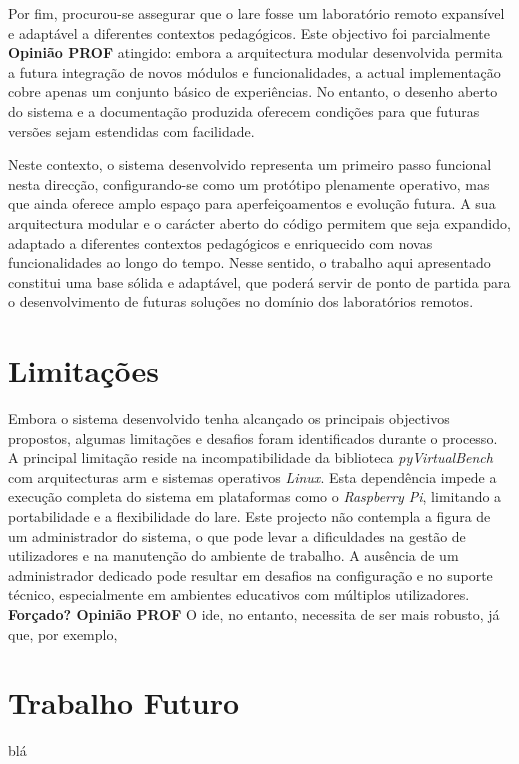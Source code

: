 Por fim, procurou-se assegurar que o \acrshort{lare} fosse um \acrshort{laboratório remoto} expansível e adaptável a diferentes contextos pedagógicos. Este objectivo foi parcialmente \textbf{Opinião PROF} atingido: embora a arquitectura modular desenvolvida permita a futura integração de novos módulos e funcionalidades, a actual implementação cobre apenas um conjunto básico de experiências. No entanto, o desenho aberto do sistema e a documentação produzida oferecem condições para que futuras versões sejam estendidas com facilidade.

Neste contexto, o sistema desenvolvido representa um primeiro passo funcional nesta direcção, configurando-se como um protótipo plenamente operativo, mas que ainda oferece amplo espaço para aperfeiçoamentos e evolução futura. A sua arquitectura modular e o carácter aberto do código permitem que seja expandido, adaptado a diferentes contextos pedagógicos e enriquecido com novas funcionalidades ao longo do tempo. Nesse sentido, o trabalho aqui apresentado constitui uma base sólida e adaptável, que poderá servir de ponto de partida para o desenvolvimento de futuras soluções no domínio dos laboratórios remotos.

\section{Limitações}
\label{limitacoes}
Embora o sistema desenvolvido tenha alcançado os principais objectivos propostos, algumas limitações e desafios foram identificados durante o processo. A principal limitação reside na incompatibilidade da biblioteca \textit{pyVirtualBench} com arquitecturas \acrshort{arm} e sistemas operativos \textit{Linux}. Esta dependência impede a execução completa do sistema em plataformas como o \textit{Raspberry Pi}, limitando a portabilidade e a flexibilidade do \acrshort{lare}. Este projecto não contempla a figura de um administrador do sistema, o que pode levar a dificuldades na gestão de utilizadores e na manutenção do ambiente de trabalho. A ausência de um administrador dedicado pode resultar em desafios na configuração e no suporte técnico, especialmente em ambientes educativos com múltiplos utilizadores. \textbf{Forçado? Opinião PROF} O \acrshort{ide}, no entanto, necessita de ser mais robusto, já que, por exemplo, 

\section{Trabalho Futuro}
\label{trabalho_futuro}
blá